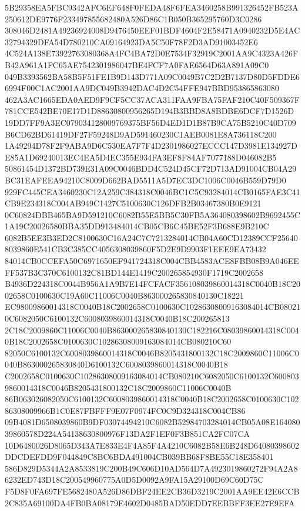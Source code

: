 \documentclass[UTF8,fontset=fandol,zihao=-4,a4paper]{ctexart}
\begin{document}
{{5B29358EA5FBC9342AFC6EF648F0FEDA48F6FEA3460258B991326452FB523A250612DE9776F233497855682480A526D86C1B050B365295760D3C0286
308046D2481A49236924008D9476450EEF01BDF4604F2E58471A0940232D5E4AC32794329DFA54D780210CA09164923DA5C50F78F2D3AD91003452E6
4C524A138E73922763080368A4FC4BA72D0E7534F32919C2001AA9C4323A426FB42A961A1FC65AE7542301986047BE4FCF7A0FAE6564D63A891A09C0
049B3393562BA58B5F51FE1B9D143D771A09C0049B7C2D2B7137D80D5FDDE66994F00C1AC2001AA9DC049B3942DAC4D2C54FFE947BBD953865863080
462A3AC1665EDA0AED9F9CF5CC37ACA311FAA9FBA75FAF210C40F509367F781CCE542BE70E17D1D88630800956265D194B3BBD8A8BDBE6DCF7D1526D
19DD7FF9A3EC079034128009769375BF56D4ED1D1B87B9CA75B5210C40D709B6CD62BD61419DF27F59248D9AD591460230C1AEB0081E8A736118C200
1A49294D78F2F9ABA9D6C530EA7F7F4D2301986027ECCC147D3981E134927DE85A1D69240013EC4EA5D4EC355E934FA3EF8F84AF7077188D046082B5
50861454D1372BD739E31A09C0046BDD4C524D45CF72D713AD91004CB04A29BC31EAFEEA94210C8009D662BAD5511A5D7EC3DC1006C0046B559D79D0
929FC445CEA3460230C12A259C384318C0046BC1C5C93284014CB0165FAE3C41CB9E234318C004AB949C1427C5100630C126DFB2B03467380B0E9121
0C60824DBB465BA9D591210C6082B55E5BB5C30FB5A364080398602B9692455C1A19C20026580BBA35DD913484014CB05CB6C45BE52F3B688E9B210C
6082B5EE3B3ED2C8100630C16A24C7C7213284014CB04A60CD12389CCF256408039860E541CB3C385CC4056308039860F5D2E9D9903F1EEE9EA73432
84014CB0CCEFA50C6971650EF941724318C004CBB4583ACE8FBB08B9A046EEFF537B3C370C6100132C81BD144E1419C200265854930F1719C2002658
B4936D224318C0044B956A1A9B7E14FCFACF356108039860014318C0040B18C2002658C0100630C19A60C11006C0040B863000265830840130C18221
EC98009860014318C0040B18C2002658C0100630C10286308009163084014CB080210C6082050C6100132C6008039860014318C0040B18C200265813
2C18C2009860C11006C0040B863000265830840130C182216C08039860014318C0040B18C2002658C0100630C10286308009163084014CB080210C60
82050C6100132C6008039860014318C0046B8205431800132C18C2009860C11006C0040B863000265830840D6100132C6008039860014318C0040B18
C2002658C0100630C10286308009163084014CB080210C6082050C6100132C6008039860014318C0046B8205431800132C18C2009860C11006C0040B
86B063026082050C6100132C6008039860014318C0040B18C2002658C0100630C10286308009966B1C0E87FBFFF9E07F0974FC0C9D324318C004CB86
09B4081D6508039860B9DF03074494210C6082B52984703284014CB05A08E16408039860578D224A54138630800976F13DA2F1EF0F3B851CA2FC07CA
10D6480026D8065D343A7E833E4F4A85F4A4210C6082B58E6B248D64080398602DDCDEFDD9F044849C8BC6BDA491004CB039BB68F8BE55C18E358401
586D829D5344A2A8533819C200B49C606D10AD564D7A4923019860272F94A2A86232ED743D18C200549960775A0D5D0092A9FA15A29100D69C60D75C
F5D8F0FA697FE5682480A526D86DBF24EE2CB36D3219C2001AA9EE42E6CCB2C835A69100DA4FB0BA08179E4602D0485BAD50EDD7EEBBFF3EE27E9EFA
}}
\end{document}
